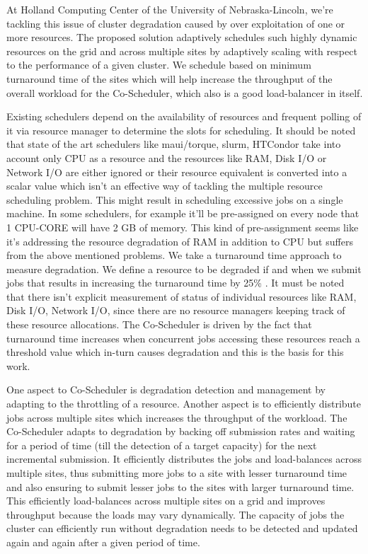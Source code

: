 \documentclass[ms,electronic,double]{nuthesis}
\begin{document}
At Holland Computing Center of the University of Nebraska-Lincoln, we're 
tackling this issue of cluster degradation caused by 
over exploitation of one or more resources. 
The proposed solution adaptively schedules 
such highly dynamic resources on the grid and across multiple sites by adaptively scaling with respect to
the performance of a given cluster. We schedule based on minimum turnaround time of the sites which will help increase 
the throughput of the overall workload for the Co-Scheduler, which also is a good load-balancer in itself.

Existing schedulers depend on the availability of resources and frequent polling 
of it via resource manager to determine the slots for scheduling. It should be noted that state of the art 
schedulers like maui/torque, slurm, HTCondor take into account only CPU as a 
resource and the resources like RAM, Disk I/O or Network I/O are either ignored or 
their resource equivalent is converted into a scalar value which isn't an effective way of tackling the 
multiple resource scheduling problem. This might result in scheduling excessive jobs 
on a single machine. In some schedulers, for example it'll be pre-assigned on every node that 1 CPU-CORE will have 2 GB of
memory. This kind of pre-assignment seems like it's addressing the resource degradation of RAM in addition to CPU but suffers 
from the above mentioned problems. We take a turnaround time approach to measure degradation. We define a resource 
to be degraded if and when we submit jobs that results in increasing the 
turnaround time by 25\% . It must be 
noted that there isn't explicit measurement of status of individual resources like RAM, Disk I/O, 
Network I/O, since there are no resource managers keeping track of these resource allocations. 
The Co-Scheduler is driven by the fact that turnaround time increases when 
concurrent jobs accessing these resources reach a threshold value which in-turn causes 
degradation and this is the basis for this work.

One aspect to Co-Scheduler is degradation detection and management by adapting 
to the throttling of a resource. Another aspect is to efficiently distribute jobs 
across multiple sites which increases the throughput of the workload. The Co-Scheduler adapts to degradation by backing off submission rates and waiting for a 
period of time (till the detection of a target capacity) for the next incremental submission. It efficiently 
distributes the jobs and load-balances across multiple sites, thus submitting more 
jobs to a site with lesser turnaround time and also ensuring to submit lesser 
jobs to the sites with larger turnaround time. This efficiently load-balances 
across multiple sites on a grid and improves throughput because the loads may vary dynamically. 
The capacity of jobs the cluster can efficiently run without degradation needs to be detected and updated again and 
again after a given period of time.
\end{document}
